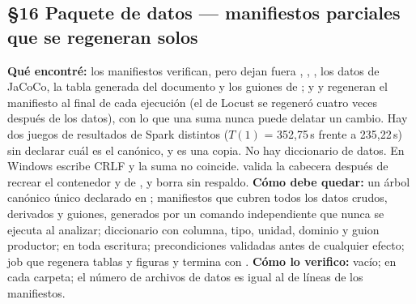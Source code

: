\subsection*{\S16 Paquete de datos --- manifiestos parciales que se regeneran solos}
\textbf{Qu\'e encontr\'e:} los manifiestos verifican, pero dejan fuera , , , los datos de JaCoCo, la tabla generada del documento y los guiones de ; y  y  regeneran el manifiesto al final de cada ejecuci\'on (el de Locust se regener\'o cuatro veces despu\'es de los datos), con lo que una suma nunca puede delatar un cambio. Hay dos juegos de resultados de Spark distintos ($T(1)$ = 352,75\,s frente a 235,22\,s) sin declarar cu\'al es el can\'onico, y  es una copia. No hay diccionario de datos. En Windows  escribe CRLF y la suma no coincide.  valida la cabecera despu\'es de recrear el contenedor y de , y borra  sin respaldo. \textbf{C\'omo debe quedar:} un \'arbol can\'onico \'unico declarado en ; manifiestos que cubren todos los datos crudos, derivados y guiones, generados por un comando independiente que nunca se ejecuta al analizar; diccionario con columna, tipo, unidad, dominio y guion productor;  en toda escritura; precondiciones validadas antes de cualquier efecto; job  que regenera tablas y figuras y termina con . \textbf{C\'omo lo verifico:}  vac\'io;  en cada carpeta; el n\'umero de archivos de datos es igual al de l\'ineas de los manifiestos.

